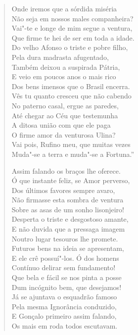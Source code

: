 \begin{verse}
Onde iremos que a sórdida miséria\\
Não seja em nossos males companheira?\\
Vai"-te e longe de mim segue a ventura,\\
Que firme te hei de ser em toda a idade.\\
Do velho Afonso o triste e pobre filho,\\
Pela dura madrasta afugentado,\\
Também deixou a suspirada Pátria,\\
E veio em poucos anos o mais rico\\
Dos bens imensos que o Brasil encerra.\\
Vês tu quanto cresceu que não cabendo\\
No paterno casal, ergue as paredes,\\
Até chegar ao Céu que testemunha\\
A ditosa união com que ele paga\\
O firme amor da venturosa Ulina?\\
Vai pois, Rufino meu, que muitas vezes\\
Muda"-se a terra e muda"-se a Fortuna.'' \\[10pt] 		\index{\Fortu}


Assim falando os braços lhe oferece.\\
Ó que instante feliz, se Amor perverso,\\		\index{\Amor}
Dos últimos favores sempre avaro,\\
Não firmasse esta sombra de ventura\\
Sobre as asas de um sonho lisonjeiro!\\
Desperta o triste e desgostoso amante,\\
E não duvida que a pressaga imagem\\
Noutro lugar tesouros lhe promete.\\
Futuros bens na ideia se apresentam,\\
E ele crê possuí"-los. Ó dos homens\\
Contínuo delirar sem fundamento!\\
Que bela e fácil se nos pinta a posse\\
Dum incógnito bem, que desejamos! \\[10pt]


Já se ajuntava o esquadrão famoso\\
Pela mesma Ignorância conduzido,\\			\index{\Ignor}
E Gonçalo primeiro assim falando,\\
Os mais em roda todos escutavam. \\[10pt]



\end{verse}
